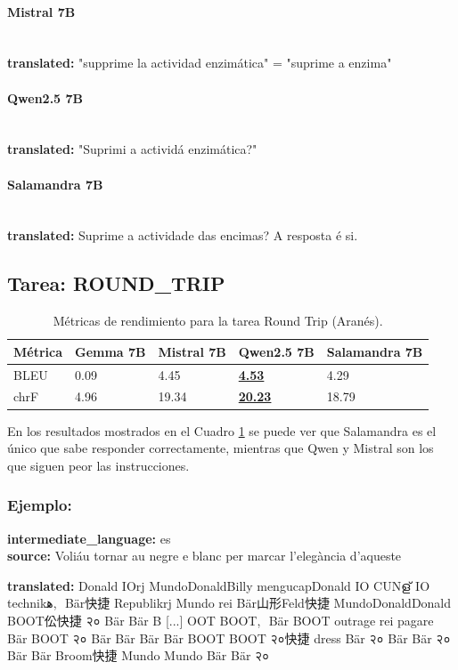 \paragraph{Mistral 7B}~\\
\textbf{translated:} "supprime la actividad enzimática" = "suprime a enzima"

\paragraph{Qwen2.5 7B}~\\
\textbf{translated:} "Suprimi a actividá enzimática?"

\paragraph{Salamandra 7B}~\\
\textbf{translated:} Suprime a actividade das encimas?  A resposta é si.

\subsection{Tarea: ROUND\_TRIP}\label{tarea-round_trip}
\begin{longtable}[]{@{}lllll@{}}
\toprule\noalign{}
Métrica & Gemma 7B & Mistral 7B & Qwen2.5 7B & Salamandra 7B \\
\midrule\noalign{}
\endhead
\bottomrule\noalign{}
\caption{Métricas de rendimiento para la tarea Round Trip (Aranés).}
\label{tab:metricas_round_trip_Aranés}
\endlastfoot
BLEU & 0.09 & 4.45 & \textbf{\underline{4.53}} & 4.29 \\
chrF & 4.96 & 19.34 & \textbf{\underline{20.23}} & 18.79 \\
\end{longtable}
En los resultados mostrados en el Cuadro \ref{tab:metricas_round_trip_Aranés} se puede ver que Salamandra es el único que sabe responder correctamente, mientras que Qwen y Mistral son los que siguen peor las instrucciones. 

\subsubsection{Ejemplo:}
\textbf{intermediate\_language:} es\\
\textbf{source:} Voliáu tornar au negre e blanc per marcar l’elegància d’aqueste

\textbf{translated:} Donald IOrj MundoDonaldBilly mengucapDonald IO CUNള് IO technikﻫ,\,\ Bär快捷 Republikrj Mundo rei Bär山形Feld快捷 MundoDonaldDonald BOOT伀快捷 २० Bär Bär B [...] OOT BOOT,\,\ Bär BOOT outrage rei pagare Bär BOOT २० Bär Bär Bär Bär BOOT BOOT २०快捷 dress Bär २० Bär Bär २० Bär Bär Broom快捷 Mundo Mundo Bär Bär २०


